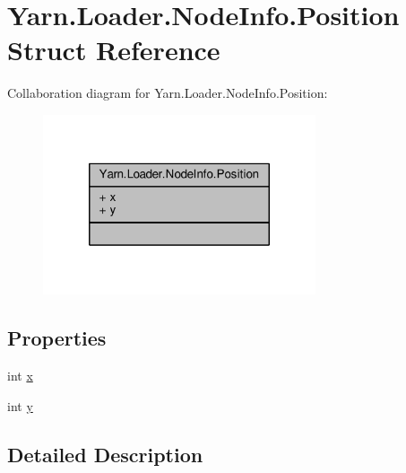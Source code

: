 \hypertarget{a00125}{\section{Yarn.\-Loader.\-Node\-Info.\-Position Struct Reference}
\label{a00125}
}


Collaboration diagram for Yarn.\-Loader.\-Node\-Info.\-Position\-:
\nopagebreak
\begin{figure}[H]
\begin{center}
\leavevmode
\includegraphics[width=228pt]{dc/dac/a00585}
\end{center}
\end{figure}
\subsection*{Properties}
\begin{DoxyCompactItemize}
\item 
int \hyperlink{a00125_a6b40110781090293fbcd2d6f7695ae4d}{x}
\item 
int \hyperlink{a00125_a390d560bd9faa3a32d8a0489c69be9e0}{y}
\end{DoxyCompactItemize}


\subsection{Detailed Description}



